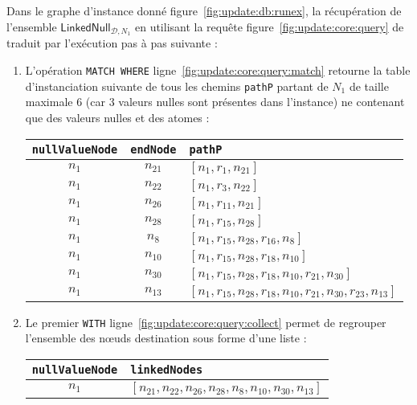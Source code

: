 \begin{example}
	Dans le graphe d'instance donné figure~\ref{fig:update:db:runex}, la récupération de l'ensemble $\textsf{LinkedNull}_{\mathcal{D}, N_1}$ en utilisant la requête figure~\ref{fig:update:core:query} de traduit par l'exécution pas à pas suivante :
	\begin{enumerate}[label=Etape~\arabic*]
		\item L'opération \verb|MATCH WHERE| ligne~\ref{fig:update:core:query:match} retourne la table d'instanciation suivante de tous les chemins \verb|pathP| partant de $N_1$ de taille maximale 6 (car 3 valeurs nulles sont présentes dans l'instance) ne contenant que des valeurs nulles et des atomes :
		\begin{center}
			\begin{tabular}{ccl}
				\hline
				\verb|nullValueNode| & \verb|endNode| & \verb|pathP| \\
				\hline
				$n_{1}$ & $n_{21}$ & $[n_{1}, r_{1}, n_{21}]$\\
				$n_{1}$ & $n_{22}$ & $[n_{1}, r_{3}, n_{22}]$\\
				$n_{1}$ & $n_{26}$ & $[n_{1}, r_{11}, n_{21}]$\\
				$n_{1}$ & $n_{28}$ & $[n_{1}, r_{15}, n_{28}]$\\
				$n_{1}$ & $n_{8}$ & $[n_{1}, r_{15}, n_{28}, r_{16}, n_{8}]$\\
				$n_{1}$ & $n_{10}$ & $[n_{1}, r_{15}, n_{28}, r_{18}, n_{10}]$\\
				$n_{1}$ & $n_{30}$ & $[n_{1}, r_{15}, n_{28}, r_{18}, n_{10}, r_{21}, n_{30}]$\\
				$n_{1}$ & $n_{13}$ & $[n_{1}, r_{15}, n_{28}, r_{18}, n_{10}, r_{21}, n_{30}, r_{23}, n_{13}]$\\
				\hline
			\end{tabular}
		\end{center}
		\item Le premier \verb|WITH| ligne~\ref{fig:update:core:query:collect} permet de regrouper l'ensemble des nœuds destination sous forme d'une liste :
		\begin{center}
			\begin{tabular}{cl}
				\hline
				\verb|nullValueNode| & \verb|linkedNodes| \\
				\hline
				$n_{1}$ & $[n_{21}, n_{22}, n_{26}, n_{28}, n_{8}, n_{10}, n_{30}, n_{13}]$\\
				\hline
			\end{tabular}
		\end{center}

\end{enumerate}
\end{example}
